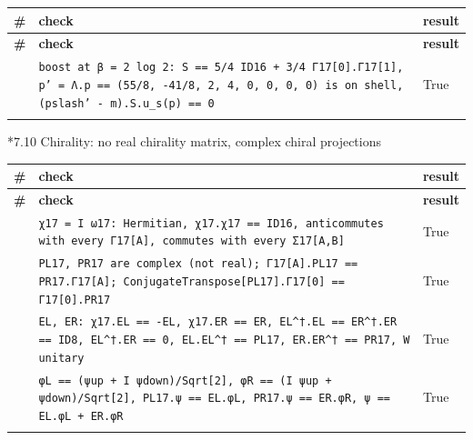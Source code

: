 \documentclass[10pt,a4paper]{article}
\makeatletter
\renewcommand\subsubsection{\@startsection{subsubsection}{3}{\z@}{-3.25ex\@plus -1ex \@minus -.2ex}{1.5ex \@plus .2ex}{\normalfont\normalsize\bfseries\raggedright}}
\makeatother
\begin{document}
{\footnotesize
\begin{longtable}{>{\raggedright\arraybackslash}p{}>{\raggedright\arraybackslash}p{}>{\raggedright\arraybackslash}p{}}
\toprule
\textbf{\#} & \textbf{check} & \textbf{result} \\
\midrule\endfirsthead
\toprule
\textbf{\#} & \textbf{check} & \textbf{result} \\
\midrule\endhead
\endfoot
\bottomrule\endlastfoot
154 & \texttt{boost at β = 2 log 2: S == 5/\allowbreak{}4 ID16 + 3/\allowbreak{}4 Γ17[0].Γ17[1], p' = Λ.p == (55/\allowbreak{}8, -41/\allowbreak{}8, 2, 4, 0, 0, 0, 0) is on shell, (pslash' - m).S.u\_\allowbreak{}s(p) == 0} & True \\*
\end{longtable}}
\subsubsection*{7.10 Chirality: no real chirality matrix, complex chiral projections}
{\footnotesize
\begin{longtable}{>{\raggedright\arraybackslash}p{}>{\raggedright\arraybackslash}p{}>{\raggedright\arraybackslash}p{}}
\toprule
\textbf{\#} & \textbf{check} & \textbf{result} \\
\midrule\endfirsthead
\toprule
\textbf{\#} & \textbf{check} & \textbf{result} \\
\midrule\endhead
\endfoot
\bottomrule\endlastfoot
155 & \texttt{χ17 = I ω17: Hermitian, χ17.χ17 == ID16, anticommutes with every Γ17[A], commutes with every Σ17[A,B]} & True \\
156 & \texttt{PL17, PR17 are complex (not real); Γ17[A].PL17 == PR17.Γ17[A]; ConjugateTranspose[PL17].Γ17[0] == Γ17[0].PR17} & True \\
157 & \texttt{EL, ER: χ17.EL == -EL, χ17.ER == ER, EL\textasciicircum{}†.EL == ER\textasciicircum{}†.ER == ID8, EL\textasciicircum{}†.ER == 0, EL.EL\textasciicircum{}† == PL17, ER.ER\textasciicircum{}† == PR17, W unitary} & True \\
158 & \texttt{φL == (ψup + I ψdown)/\allowbreak{}Sqrt[2], φR == (I ψup + ψdown)/\allowbreak{}Sqrt[2], PL17.ψ == EL.φL, PR17.ψ == ER.φR, ψ == EL.φL + ER.φR} & True \\*
\end{longtable}}
\end{document}
